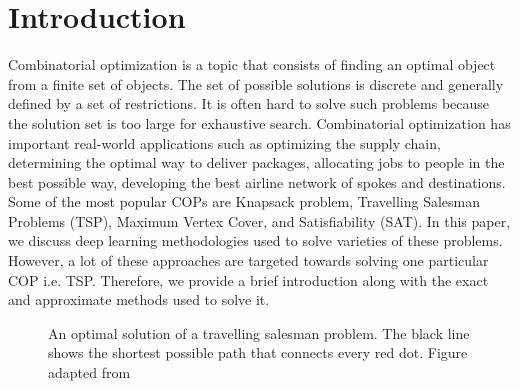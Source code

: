 \documentclass{article}
\begin{document}
\section{Introduction}
Combinatorial optimization is a topic that consists of finding an optimal object from a finite set of objects. The set of possible solutions is discrete and generally defined by a set of restrictions. It is often hard to solve such problems because the solution set is too large for exhaustive search. Combinatorial optimization has important real-world applications such as optimizing the supply chain, determining the optimal way to deliver packages, allocating jobs to people in the best possible way, developing the best airline network of spokes and destinations. Some of the most popular COPs are Knapsack problem, Travelling Salesman Problems (TSP), Maximum Vertex Cover, and Satisfiability (SAT). In this paper, we discuss deep learning methodologies used to solve varieties of these problems. However, a lot of these approaches are targeted towards solving one particular COP i.e. TSP. Therefore, we provide a brief introduction along with the exact and approximate methods used to solve it. 

\begin{figure}
    \caption{An optimal solution of a travelling salesman problem. The black line shows the shortest possible path that connects every red dot. Figure adapted from \cite{wikipedia_2020}}
    \label{fig:tsp}
\end{figure}
\end{document}
